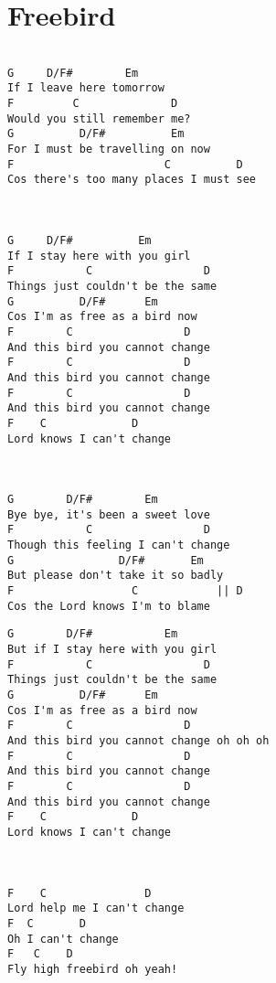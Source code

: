 \documentclass[leqno]{memoir}
\begin{document}
\chapter{Freebird}
\begin{verbatim}

G     D/F#        Em
If I leave here tomorrow
F         C              D
Would you still remember me?
G          D/F#          Em
For I must be travelling on now
F                       C          D
Cos there's too many places I must see



G     D/F#          Em
If I stay here with you girl
F           C                 D
Things just couldn't be the same
G          D/F#      Em
Cos I'm as free as a bird now
F        C                 D
And this bird you cannot change
F        C                 D
And this bird you cannot change
F        C                 D
And this bird you cannot change
F    C             D
Lord knows I can't change



G        D/F#        Em
Bye bye, it's been a sweet love
F           C                 D
Though this feeling I can't change
G                D/F#       Em
But please don't take it so badly
F                  C            || D
Cos the Lord knows I'm to blame
\end{verbatim}
\newpage
\begin{verbatim}
G        D/F#           Em
But if I stay here with you girl
F           C                 D
Things just couldn't be the same
G          D/F#      Em
Cos I'm as free as a bird now
F        C                 D
And this bird you cannot change oh oh oh
F        C                 D
And this bird you cannot change
F        C                 D
And this bird you cannot change
F    C             D
Lord knows I can't change



F    C               D
Lord help me I can't change
F  C       D
Oh I can't change
F   C    D
Fly high freebird oh yeah!
\end{verbatim}
\newpage
\end{document}
